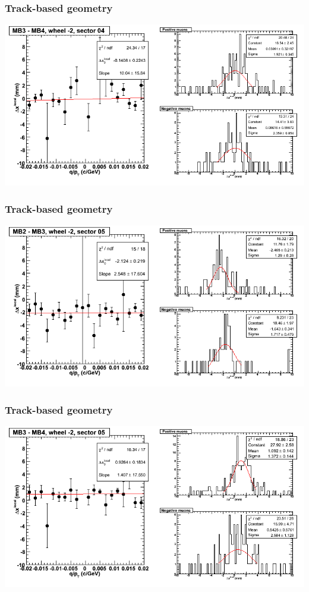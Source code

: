 \documentclass[compress]{beamer}
\begin{document}
\begin{frame}
\frametitle{Track-based geometry}
\includegraphics[width=\linewidth]{NOV4_segdiffs/dt13_resid_A_04_34.png}
\end{frame}

\begin{frame}
\frametitle{Track-based geometry}
\includegraphics[width=\linewidth]{NOV4_segdiffs/dt13_resid_A_05_23.png}
\end{frame}

\begin{frame}
\frametitle{Track-based geometry}
\includegraphics[width=\linewidth]{NOV4_segdiffs/dt13_resid_A_05_34.png}
\end{frame}
\end{document}
